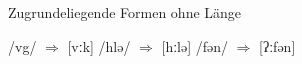 \begin{frame}
  {Zugrundeliegende Formen ohne Länge}
  \begin{exe}
    \ex\label{ex:gespanntheitbetonungundlaenge028} \begin{xlist}
      \ex /vg/ $\Rightarrow$ [vːk]
      \ex /hlə/ $\Rightarrow$ [hːlə]
      \ex /fən/ $\Rightarrow$ [ʔːfən]
    \end{xlist}
  \end{exe}
\end{frame}


